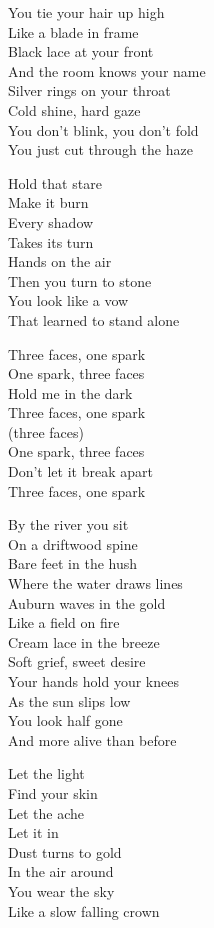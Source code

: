 \begin{lyrics}

You tie your hair up high\\
Like a blade in frame\\
Black lace at your front\\
And the room knows your name\\
Silver rings on your throat\\
Cold shine, hard gaze\\
You don’t blink, you don’t fold\\
You just cut through the haze

Hold that stare\\
Make it burn\\
Every shadow\\
Takes its turn\\
Hands on the air\\
Then you turn to stone\\
You look like a vow\\
That learned to stand alone

Three faces, one spark\\
One spark, three faces\\
Hold me in the dark\\
Three faces, one spark\\
(three faces)\\
One spark, three faces\\
Don’t let it break apart\\
Three faces, one spark

By the river you sit\\
On a driftwood spine\\
Bare feet in the hush\\
Where the water draws lines\\
Auburn waves in the gold\\
Like a field on fire\\
Cream lace in the breeze\\
Soft grief, sweet desire\\
Your hands hold your knees\\
As the sun slips low\\
You look half gone\\
And more alive than before

Let the light\\
Find your skin\\
Let the ache\\
Let it in\\
Dust turns to gold\\
In the air around\\
You wear the sky\\
Like a slow falling crown


\end{lyrics}

